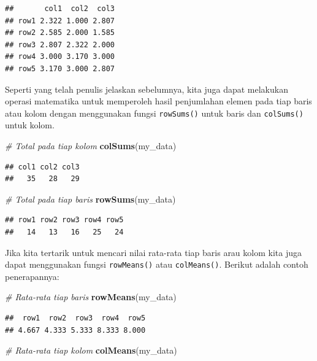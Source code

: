 \documentclass[
]{book}
\newenvironment{Shaded}{\begin{snugshade}}{\end{snugshade}}
\newcommand{\CommentTok}[1]{\textcolor[rgb]{0.56,0.35,0.01}{\textit{#1}}}
\newcommand{\FunctionTok}[1]{\textcolor[rgb]{0.13,0.29,0.53}{\textbf{#1}}}
\newcommand{\NormalTok}[1]{#1}
\theoremstyle{definition}
\theoremstyle{definition}
\theoremstyle{definition}
\theoremstyle{definition}
\theoremstyle{remark}
\begin{document}
\begin{verbatim}
##       col1  col2  col3
## row1 2.322 1.000 2.807
## row2 2.585 2.000 1.585
## row3 2.807 2.322 2.000
## row4 3.000 3.170 3.000
## row5 3.170 3.000 2.807
\end{verbatim}

Seperti yang telah penulis jelaskan sebelumnya, kita juga dapat melakukan operasi matematika untuk memperoleh hasil penjumlahan elemen pada tiap baris atau kolom dengan menggunakan fungsi \texttt{rowSums()} untuk baris dan \texttt{colSums()} untuk kolom.

\begin{Shaded}
\begin{Highlighting}[]
\CommentTok{\# Total pada tiap kolom}
\FunctionTok{colSums}\NormalTok{(my\_data)}
\end{Highlighting}
\end{Shaded}

\begin{verbatim}
## col1 col2 col3 
##   35   28   29
\end{verbatim}

\begin{Shaded}
\begin{Highlighting}[]
\CommentTok{\# Total pada tiap baris}
\FunctionTok{rowSums}\NormalTok{(my\_data)}
\end{Highlighting}
\end{Shaded}

\begin{verbatim}
## row1 row2 row3 row4 row5 
##   14   13   16   25   24
\end{verbatim}

Jika kita tertarik untuk mencari nilai rata-rata tiap baris arau kolom kita juga dapat menggunakan fungsi \texttt{rowMeans()} atau \texttt{colMeans()}. Berikut adalah contoh penerapannya:

\begin{Shaded}
\begin{Highlighting}[]
\CommentTok{\# Rata{-}rata tiap baris}
\FunctionTok{rowMeans}\NormalTok{(my\_data)}
\end{Highlighting}
\end{Shaded}

\begin{verbatim}
##  row1  row2  row3  row4  row5 
## 4.667 4.333 5.333 8.333 8.000
\end{verbatim}

\begin{Shaded}
\begin{Highlighting}[]
\CommentTok{\# Rata{-}rata tiap kolom}
\FunctionTok{colMeans}\NormalTok{(my\_data)}
\end{Highlighting}
\end{Shaded}
\end{document}
